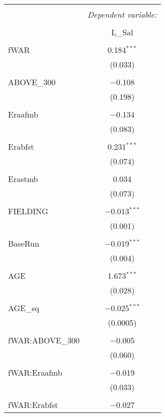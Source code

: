
\begin{table}[!htbp] \centering
  \caption{}
  \label{}
  \scriptsize
\begin{tabular}{@{\extracolsep{5pt}}lc}
\\[-1.8ex]\hline
\hline \\[-1.8ex]
 & \multicolumn{1}{c}{\textit{Dependent variable:}} \\
\cline{2-2}
\\[-1.8ex] & L\_Sal \\
\hline \\[-1.8ex]
 fWAR & 0.184$^{***}$ \\
  & (0.033) \\
  & \\
 ABOVE\_300 & $-$0.108 \\
  & (0.198) \\
  & \\
 Eraafmb & $-$0.134 \\
  & (0.083) \\
  & \\
 Erabfst & 0.231$^{***}$ \\
  & (0.074) \\
  & \\
 Erastmb & 0.034 \\
  & (0.073) \\
  & \\
 FIELDING & $-$0.013$^{***}$ \\
  & (0.001) \\
  & \\
 BaseRun & $-$0.019$^{***}$ \\
  & (0.004) \\
  & \\
 AGE & 1.673$^{***}$ \\
  & (0.028) \\
  & \\
 AGE\_sq & $-$0.025$^{***}$ \\
  & (0.0005) \\
  & \\
 fWAR:ABOVE\_300 & $-$0.005 \\
  & (0.060) \\
  & \\
 fWAR:Eraafmb & $-$0.019 \\
  & (0.033) \\
  & \\
 fWAR:Erabfst & $-$0.027 \\

\end{tabular}
\end{table}
